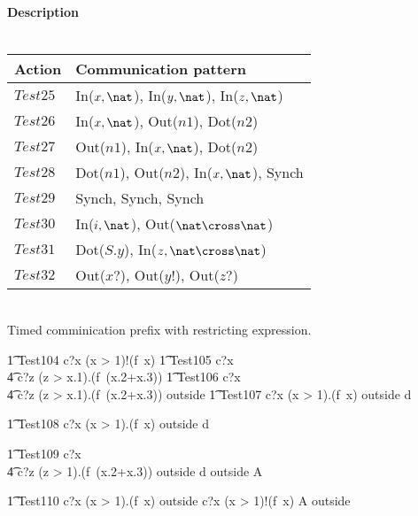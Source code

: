 \documentclass{article}
\begin{document}
\paragraph{Description \\ \\}

\vspace{2pt}
\begin{tabular}{l|l}
   \hline
   Action   & Communication pattern \\
   \hline
   $Test25$  & In($x, \nat$), In($y, \nat$), In($z, \nat$) \\
   \hline
   $Test26$  & In($x, \nat$), Out($n1$), Dot($n2$) \\
   \hline
   $Test27$  & Out($n1$), In($x, \nat$), Dot($n2$) \\
   \hline
   $Test28$  & Dot($n1$), Out($n2$), In($x, \nat$), Synch \\
   \hline
   $Test29$  & Synch, Synch, Synch \\
   \hline
   $Test30$  & In($i, \nat$), Out($\nat \cross \nat$) \\
   \hline
   $Test31$  & Dot($S.y$), In($z, \nat \cross \nat$) \\
   \hline
   $Test32$  & Out($x?$), Out($y!$), Out($z?$) \\
   \hline
\end{tabular}
\\

Timed comminication prefix  with restricting expression. 
%
\begin{circusaction}
   \t1 Test104 \circdef c?x \prefixcolon (x > 1)!(f~x) \then  \Skip
   \also
   \t1 Test105 \circdef c?x \then \\
                  \t4 c?z \prefixcolon (z > x.1).(f~(x.2+x.3)) \then \Skip 
   \also
   \t1 Test106 \circdef c?x \then \\
                  \t4 c?z \prefixcolon (z > x.1).(f~(x.2+x.3)) \then \lcirctime outside \rcirctime \Skip 
\also
  \t1 Test107 \circdef c?x \prefixcolon (x > 1).(f~x) \then \lcirctime outside \rcirctime  d \then \Skip 
   \also

   \t1 Test108 \circdef c?x \prefixcolon (x > 1).(f~x) \then \lcirctime outside \rcirctime  d \then {} \rcirctime \Skip 
   \also

   \t1 Test109 \circdef c?x \then \\
		 \t4 c?z \prefixcolon (z > 1).(f~(x.2+x.3)) \then \lcirctime outside \rcirctime d \then {} \rcirctime \lcirctime outside \rcirctime \circstartby A 
   \also

   \t1 Test110 \circdef c?x \prefixcolon (x > 1).(f~x) \then \lcirctime outside \rcirctime c?x \prefixcolon (x > 1)!(f~x) \then {} \rcirctime A \circendby  \lcirctime outside \rcirctime 
\end{circusaction}
\end{document}
